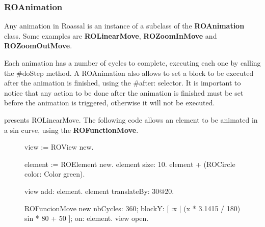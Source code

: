 \documentclass[a4paper,10pt,twoside]{book}
\begin{document}
%
%

\subsubsection*{ROAnimation}


Any animation in Roassal is an instance of a subclass of the \textbf{ROAnimation} class. Some examples are \textbf{ROLinearMove}, \textbf{ROZoomInMove} and \textbf{ROZoomOutMove}.

Each animation has a number of cycles to complete, executing each one by calling the \#doStep method.
A ROAnimation also allows to set a block to be executed after the animation is finished, using the \#after: selector. It is important to notice that any action to be done after the animation is finished must be set before the animation is triggered, otherwise it will not be executed.

 presents ROLinearMove. The following code allows an element to be animated in a sin curve, using the \textbf{ROFunctionMove}.

\begin{figure}[H]
\begin{code}{}
view := ROView new.

element := ROElement new.
element size: 10.
element + (ROCircle color: Color green).

view add: element.
element translateBy: 30@20.

ROFuncionMove new
	nbCycles: 360;
	blockY: [ :x | (x * 3.1415 / 180) sin * 80 + 50 ];
	on: element.
view open.
\end{code}
\end{figure}
\end{document}
